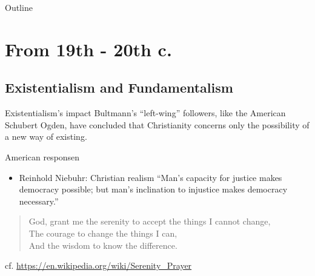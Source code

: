 

\maketitle
\begin{frame}{Outline}
\setcounter{tocdepth}{2}
\tableofcontents
\end{frame}

\section{From 19th - 20th c.}
\label{sec-1}
\subsection{Existentialism and Fundamentalism}
\label{sec-1-1}
\begin{frame}[label=sec-1-1-1]{Existentialism's impact}
Bultmann’s “left-wing” followers, like the American Schubert Ogden, have concluded that Christianity concerns only the possibility of a new way of 
existing.
\end{frame}

\begin{frame}[label=sec-1-1-2]{American responsen}
\begin{itemize}
\item Reinhold Niebuhr: Christian realism ``Man's capacity for justice makes democracy possible; but man's inclination to injustice makes democracy necessary.''
\end{itemize}
\begin{verse}
God, grant me the serenity to accept the things I cannot change, \\
The courage to change the things I can, \\
And the wisdom to know the difference. \\
\end{verse}
cf. \url{https://en.wikipedia.org/wiki/Serenity_Prayer}
\end{frame}

